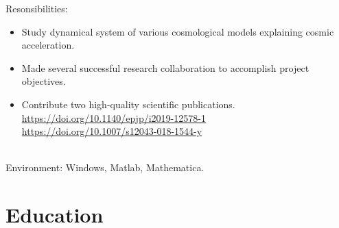 \documentclass[letterpaper]{templatecv} %
\begin{document}
\begin{twenty}
{        Resonsibilities: 
        \begin{itemize}
            \item Study dynamical system of various cosmological models explaining cosmic acceleration.  
            \item Made several successful research collaboration to accomplish project objectives. 
            \item Contribute two high-quality scientific publications.\\ \url{https://doi.org/10.1140/epjp/i2019-12578-1}\\ \url{https://doi.org/10.1007/s12043-018-1544-y}
        \end{itemize}\\
        Environment: Windows, Matlab, Mathematica.
  }
       \end{twenty}
        

    


\section{Education}
\end{document}
